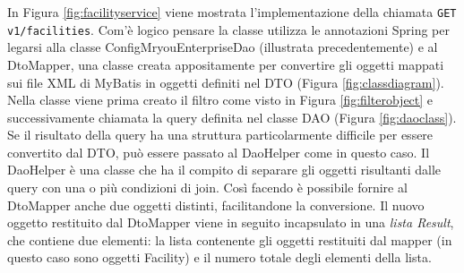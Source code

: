 In Figura \ref{fig:facilityservice} viene mostrata l'implementazione della chiamata \texttt{GET v1/facilities}. Com'è logico pensare la classe utilizza le annotazioni Spring per legarsi alla classe ConfigMryouEnterpriseDao (illustrata precedentemente) e al DtoMapper, una classe creata appositamente per convertire gli oggetti mappati sui file XML di MyBatis in oggetti definiti nel DTO (Figura \ref{fig:classdiagram}). Nella classe viene prima creato il filtro come visto in Figura \ref{fig:filterobject} e successivamente chiamata la query definita nel classe DAO (Figura \ref{fig:daoclass}). Se il risultato della query ha una struttura particolarmente difficile per essere convertito dal DTO, può essere passato al DaoHelper come in questo caso. Il DaoHelper è una classe che ha il compito di separare gli oggetti risultanti dalle query con una o più condizioni di join. Così facendo è possibile fornire al DtoMapper anche due oggetti distinti, facilitandone la conversione. Il nuovo oggetto restituito dal DtoMapper viene in seguito incapsulato in una \emph{lista Result}, che contiene due elementi: la lista contenente gli oggetti restituiti dal mapper (in questo caso sono oggetti Facility) e il numero totale degli elementi della lista.

